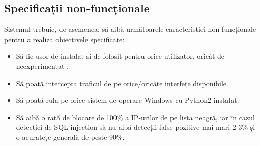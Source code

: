  \subsection{Specificații non-funcționale}

Sistemul trebuie, de asemenea, să aibă următoarele caracteristici non-funcționale pentru a realiza obiectivele specificate: 
\begin{itemize}
  \item Să fie ușor de instalat și de folosit pentru orice utilizator, oricât de neexperimentat .
  \item  Să poată intercepta traficul de pe orice/oricâte interfețe disponibile. 
  \item  Să poată rula pe orice sistem de operare Windows cu Python2 instalat. 
  \item  Să aibă o rată de blocare de 100\% a IP-urilor de pe lista neagră, iar 
  în cazul detecției de SQL injection să nu aibă detecții false pozitive mai mari 2-3\% 
  și o acuratețe generală de peste 90\%.
\end{itemize}




